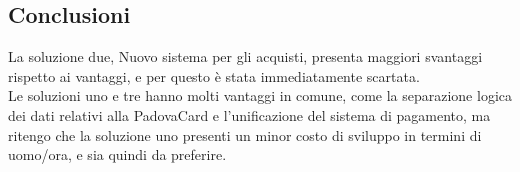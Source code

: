 \subsection{Conclusioni}
La soluzione due, Nuovo sistema per gli acquisti, presenta maggiori svantaggi rispetto ai vantaggi, e per questo è stata immediatamente scartata. \\

Le soluzioni uno e tre hanno molti vantaggi in comune, come la separazione logica dei dati relativi alla PadovaCard e l'unificazione del sistema di pagamento, ma ritengo che la soluzione uno presenti un minor costo di sviluppo in termini di uomo/ora, e sia quindi da preferire.